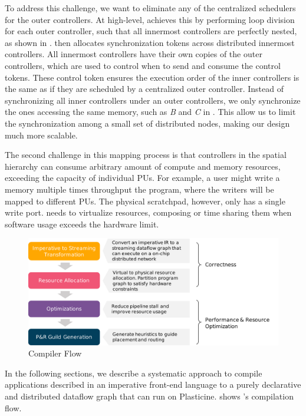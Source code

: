 To address this challenge, we want to eliminate any of the centralized schedulers for the outer
controllers.
At high-level, \name achieves this by performing loop division for each outer controller, such that
all innermost controllers are perfectly nested, as shown in .
\name then allocates synchronization tokens across distributed innermost controllers.
All innermost controllers have their own copies of the outer controllers, which are used
to control when to send and consume the control tokens.
These control token ensures the execution order of the inner controllers is the same as if they are
scheduled by a centralized outer controller. Instead of synchronizing all inner controllers under an
outer controllers, we only synchronize the ones accessing the same memory, such as \emph{B} and
\emph{C} in . This allow us to limit the synchronization among a small set of distributed nodes, 
making our design much more scalable.

The second challenge in this mapping process is that controllers in the spatial hierarchy
can consume arbitrary amount of compute and memory resources, exceeding the capacity of individual
PUs. For example, a user might write a memory multiple times throughput the program, 
where the writers will be mapped to different PUs. The physical scratchpad, however, only has a single write
port. \name needs to virtualize resources, composing or time sharing them when software usage
exceeds the hardware limit.

\begin{figure}
\centering
\includegraphics[width=1\textwidth]{figs/sarastack.pdf}
\caption[\name Compiler Flow]{\name Compiler Flow}
\label{fig:flow}
\end{figure}
 
In the following sections, we describe a systematic approach to compile applications described in an
imperative front-end language to a purely declarative and distributed dataflow graph that can
run on Plasticine.  shows \name's compilation flow.

